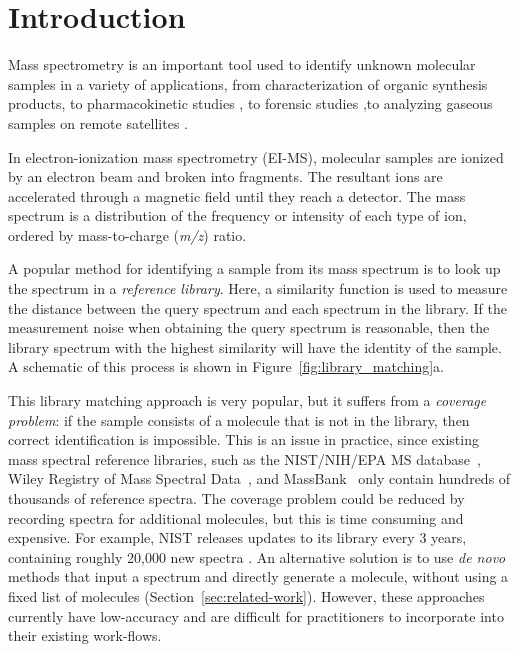 
\section{Introduction}

Mass spectrometry is an important tool used to identify unknown molecular samples in a variety of applications, from characterization of organic synthesis products, to pharmacokinetic studies \cite{massspec_pharmakinetics}, to forensic studies \cite{Zhou2017LatentFingerprints},to analyzing gaseous samples on remote satellites \cite{Petrie_ions_in_space}.

In electron-ionization mass spectrometry (EI-MS), molecular samples are ionized by an electron beam and broken into fragments. The resultant ions are accelerated through a magnetic field until they reach a detector. The mass spectrum is a distribution of the frequency or intensity of each type of ion, ordered by mass-to-charge (\textit{m/z}) ratio.

A popular method for identifying a sample from its mass spectrum is to look up the spectrum in a \textit{reference library}. Here, a similarity function is used to measure the distance between the query spectrum and each spectrum in the library. If the measurement noise when obtaining the query spectrum is reasonable, then the library spectrum with the highest similarity will have the identity of the sample. A schematic of this process is shown in Figure~\ref{fig:library_matching}a.

This library matching approach is very popular, but it suffers from a \textit{coverage problem}: if the sample consists of a molecule that is not in the library, then correct identification is impossible. This is an issue in practice, since existing mass spectral reference libraries, such as the NIST/NIH/EPA MS database~\cite{2017nist}, Wiley Registry of Mass Spectral Data~\cite{mclafferty2016wiley}, and MassBank~\cite{horai2010massbank} only contain hundreds of thousands of reference spectra. The coverage problem could be reduced by recording spectra for additional molecules, but this is time consuming and expensive. For example, NIST releases updates to its library every 3 years, containing roughly 20,000 new spectra \cite{2017nist}. An alternative solution is to use \textit{de novo} methods that input a spectrum and directly generate a molecule, without using a fixed list of molecules (Section~\ref{sec:related-work}). However, these approaches currently have low-accuracy and are difficult for practitioners to incorporate into their existing work-flows. 

